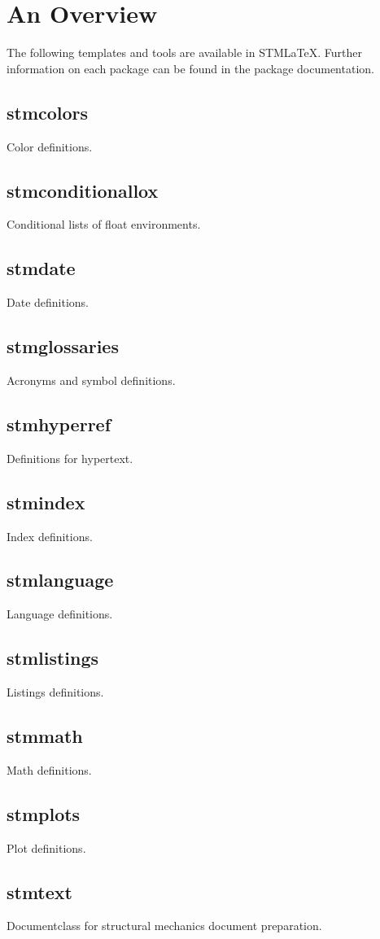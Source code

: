\documentclass[%
  type=article,%
  layout=koma,%
  page=false,%
  hyperref=true,%
  cleveref=true,%
  conditionallox=true,%
  conditionalloxnewpage=true,%
  date=true,%
  glossaries=true,%
  index=true,%
  listings=true%
]{stmtext}
\author{Martin R\"{a}del}
\title{\stmlatex}
\subtitle{%
Overview and Installation Guide\\
Copyright \copyright{} \the\year{} DLR SY STM\\v\formatdate[versiondatestyle]{\DTMToday}\\
{\bigskip\small\normalfont Thankfully inspired by the RM-\LaTeX package guide.}
}
\date{\today}
\newcommand{\package}[1]{\subsection*{#1}\par\medskip\noindent\ignorespaces}
\newcommand{\stmlatex}{STM\LaTeX\xspace}
\begin{document}
\maketitle


\begin{abstract}
\stmlatex is a template collection for \LaTeX{} documents. All features and templates are created due to personal interest and are subject to change. All packages are tested using MiKTeX 2.9. However, they are considered as \enquote{as-is} and without any warranty. For questions, suggestion and feedback, please contact the author of the particular package.

\begin{center}
\color{red}
\bfseries
\stmlatex requires an up to date \LaTeX{} installation.
\end{center}
\end{abstract}


\tableofcontents


\section{An Overview}

The following templates and tools are available in \stmlatex. Further information on each package can be found in the package documentation.

\package{stmcolors}
Color definitions.

\package{stmconditionallox}
Conditional lists of float environments.

\package{stmdate}
Date definitions.

\package{stmglossaries}
Acronyms and symbol definitions.

\package{stmhyperref}
Definitions for hypertext.

\package{stmindex}
Index definitions.

\package{stmlanguage}
Language definitions.

\package{stmlistings}
Listings definitions.

\package{stmmath}
Math definitions.

\package{stmplots}
Plot definitions.

\package{stmtext}
Documentclass for structural mechanics document preparation.
\end{document}
